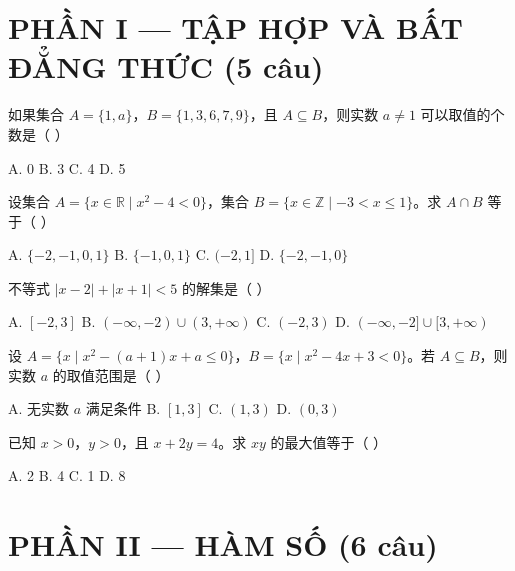 \documentclass[11pt, a4paper]{article}
\begin{document}

\section{PHẦN I — TẬP HỢP VÀ BẤT ĐẲNG THỨC (5 câu)}

\begin{baitap}[1]
如果集合 $A=\{1,a\}$，$B=\{1,3,6,7,9\}$，且 $A\subseteq B$，则实数 $a\ne1$ 可以取值的个数是（ ）
\par\vspace{3pt}
\noindent A. 0 \quad B. 3 \quad C. 4 \quad D. 5
\end{baitap}

\begin{baitap}[2]
设集合 $A=\{x\in\mathbb{R}\mid x^2-4<0\}$，集合 $B=\{x\in\mathbb{Z}\mid -3<x\le1\}$。求 $A\cap B$ 等于（ ）
\par\vspace{3pt}
\noindent A. $\{-2,-1,0,1\}$ \quad B. $\{-1,0,1\}$ \quad C. $(-2,1]$ \quad D. $\{-2,-1,0\}$
\end{baitap}

\begin{baitap}[3]
不等式 $|x-2|+|x+1|<5$ 的解集是（ ）
\par\vspace{3pt}
\noindent A. $[-2,3]$ \quad B. $(-\infty,-2)\cup(3,+\infty)$ \quad C. $(-2,3)$ \quad D. $(-\infty,-2]\cup[3,+\infty)$
\end{baitap}

\begin{baitap}[4]
设 $A=\{x\mid x^2-(a+1)x+a\le0\}$，$B=\{x\mid x^2-4x+3<0\}$。若 $A\subseteq B$，则实数 $a$ 的取值范围是（ ）
\par\vspace{3pt}
\noindent A. 无实数 $a$ 满足条件 \quad B. $[1,3]$ \quad C. $(1,3)$ \quad D. $(0,3)$
\end{baitap}

\begin{baitap}[5]
已知 $x>0$，$y>0$，且 $x+2y=4$。求 $xy$ 的最大值等于（ ）
\par\vspace{3pt}
\noindent A. 2 \quad B. 4 \quad C. 1 \quad D. 8
\end{baitap}

\section{PHẦN II — HÀM SỐ (6 câu)}
\end{document}
